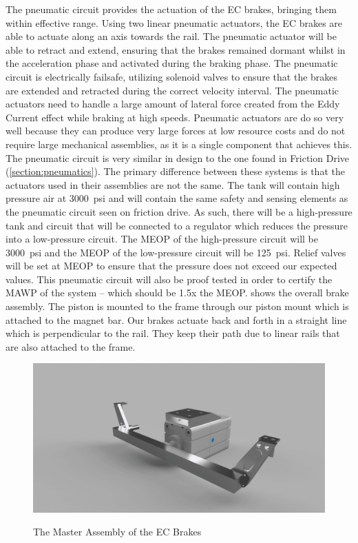 \documentclass[main.tex]{subfiles}
\begin{document}
    The pneumatic circuit provides the actuation of the EC brakes, bringing them within effective range. Using two linear pneumatic actuators, the EC brakes are able to actuate along an axis towards the rail. The pneumatic actuator will be able to retract and extend, ensuring that the brakes remained dormant whilst in the acceleration phase and activated during the braking phase. The pneumatic circuit is electrically failsafe, utilizing solenoid valves to ensure that the brakes are extended and retracted during the correct velocity interval. The pneumatic actuators need to handle a large amount of lateral force created from the Eddy Current effect while braking at high speeds. Pneumatic actuators are do so very well because they can produce very large forces at low resource costs and do not require large mechanical assemblies, as it is a single component that achieves this. The pneumatic circuit is very similar in design to the one found in Friction Drive (\autoref{section:pneumatics}). The primary difference between these systems is that the actuators used in their assemblies are not the same.
    The tank will contain high pressure air at \SI{3000}{psi} and will contain the same safety and sensing elements as the pneumatic circuit seen on friction drive. As such, there will be a high-pressure tank and circuit that will be connected to a regulator which reduces the pressure into a low-pressure circuit. The MEOP of the high-pressure circuit will be \SI{3000}{psi} and the MEOP of the low-pressure circuit will be \SI{125}{psi}. Relief valves will be set at MEOP to ensure that the pressure does not exceed our expected values. This pneumatic circuit will also be proof tested in order to certify the MAWP of the system – which should be 1.5x the MEOP.  shows the overall brake assembly. The piston is mounted to the frame through our piston mount which is attached to the magnet bar. Our brakes actuate back and forth in a straight line which is perpendicular to the rail. They keep their path due to linear rails that are also attached to the frame.
    \begin{figure}
    	\centering
        \includegraphics[width=\linewidth]{images/EC_Brake_Master_2018}
        \label{fig:ec-assembly}
        \caption{The Master Assembly of the EC Brakes}
    \end{figure}
\end{document}
